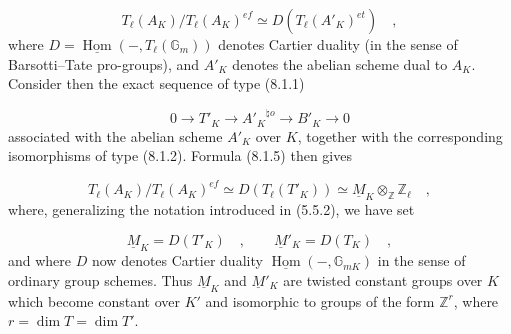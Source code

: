 \begin{equation}\tag{8.1.5}
T_\ell(A_K)/T_\ell(A_K)^{ef}
 \simeq D(T_\ell(A'_K)^{et}) \quad ,
\end{equation}
where $D=\underline{\operatorname{Hom}}(-,T_\ell(\mathbb{G}_m))$
denotes Cartier duality (in the sense of Barsotti--Tate
pro-groups), and $A'_K$ denotes the abelian scheme dual to $A_K$.
Consider then the exact sequence of type (8.1.1)

\begin{equation}\tag{8.1.6}
0 \longrightarrow T'_K \longrightarrow {A'_K}^{\natural o}
 \longrightarrow B'_K \longrightarrow 0
\end{equation}
associated with the abelian scheme $A'_K$ over $K$, together with
the corresponding isomorphisms of type (8.1.2). Formula (8.1.5)
then gives

\begin{equation}\tag{8.1.7}
T_\ell(A_K)/T_\ell(A_K)^{ef}
 \simeq D(T_\ell(T'_K))
 \simeq \underline{M}_K\otimes_{\mathbb{Z}}\mathbb{Z}_\ell \quad ,
\end{equation}
where, generalizing the notation introduced in (5.5.2), we have set

\begin{equation}\tag{8.1.8}
\underline{M}_K=D(T'_K) \quad , \qquad
\underline{M}'_K=D(T_K) \quad ,
\end{equation}
and where $D$ now denotes Cartier duality
$\underline{\operatorname{Hom}}(-,\mathbb{G}_{mK})$ in the sense of
ordinary group schemes. Thus $\underline{M}_K$ and
$\underline{M}'_K$ are twisted constant groups over $K$ which become
constant over $K'$ and isomorphic to groups of the form
$\mathbb{Z}^{r}$, where $r=\dim T=\dim T'$.

